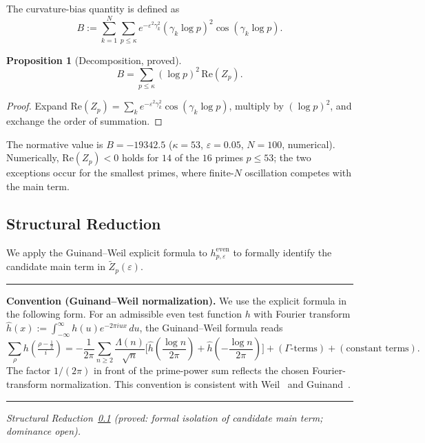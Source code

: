 \documentclass[11pt]{article}
\newtheorem{proposition}[theorem]{Proposition}
\newenvironment{conventionbox}{%
  \medskip
  \noindent\rule{\linewidth}{0.4pt}\smallskip\par\noindent
}{%
  \par\smallskip\noindent\rule{\linewidth}{0.4pt}
  \medskip
}
\newcommand{\Zt}{\widetilde{Z}}
\begin{document}
The curvature-bias quantity is defined as
\[
B := \sum_{k=1}^N\sum_{p\leq\kappa}
     e^{-\varepsilon^2\gamma_k^2}(\gamma_k\log p)^2\cos(\gamma_k\log p).
\]

\begin{proposition}[Decomposition, proved]
\label{prop:decomp}
\[
B = \sum_{p\leq\kappa}(\log p)^2\,\mathrm{Re}(Z_p).
\]
\end{proposition}

\begin{proof}
Expand $\mathrm{Re}(Z_p) = \sum_k e^{-\varepsilon^2\gamma_k^2}\cos(\gamma_k\log p)$,
multiply by $(\log p)^2$, and exchange the order of summation.
\end{proof}

The normative value is $B=-19342.5$ ($\kappa=53$, $\varepsilon=0.05$,
$N=100$, numerical).
Numerically, $\mathrm{Re}(Z_p)<0$ holds for $14$ of the $16$ primes
$p\leq 53$; the two exceptions occur for the smallest primes, where
finite-$N$ oscillation competes with the main term.

\subsection{Structural Reduction}
\label{ssec:reduction}

We apply the Guinand--Weil explicit formula to $h^{\mathrm{even}}_{p,\varepsilon}$
to formally identify the candidate main term in $\Zt_p(\varepsilon)$.

\begin{conventionbox}
\textbf{Convention (Guinand--Weil normalization).}
We use the explicit formula in the following form.
For an admissible even test function $h$ with Fourier transform
$\hat{h}(x) := \int_{-\infty}^\infty h(u)e^{-2\pi i ux}\,du$,
the Guinand--Weil formula reads
\[
\sum_\rho h\!\left(\tfrac{\rho-\frac12}{i}\right)
  = -\frac{1}{2\pi}\sum_{n\geq 2}\frac{\Lambda(n)}{\sqrt{n}}
    \bigl[\hat{h}({\textstyle\frac{\log n}{2\pi}})
          + \hat{h}({-\textstyle\frac{\log n}{2\pi}})\bigr]
  + (\Gamma\text{-terms}) + (\text{constant terms}).
\]
The factor $1/(2\pi)$ in front of the prime-power sum reflects
the chosen Fourier-transform normalization.
This convention is consistent with Weil~\cite{Weil} and
Guinand~\cite{Guinand}.
\end{conventionbox}

\textit{Structural Reduction~\ref{ssec:reduction}
(proved: formal isolation of candidate main term; dominance open).}

\medskip
\end{document}
